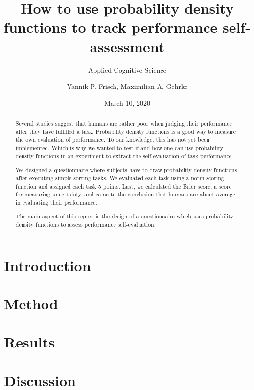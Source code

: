 \documentclass[
pdfa=false,  %
color=9c,
logo=body,
class=article,
marginpar=false,
logofile=../logos/tuda_logo.pdf
]{tudapub}
\author{Yannik P. Frisch, Maximilian A. Gehrke}
\title{How to use probability density functions to track performance self-assessment}
\date{March 10, 2020}
\subtitle{Applied Cognitive Science}
\begin{document}
\maketitle

\begin{abstract}
	Several studies suggest that humans are rather poor when judging their performance after they have fulfilled a task. Probability density functions is a good way to measure the own evaluation of performance. To our knowledge, this has not yet been implemented. Which is why we wanted to test if and how one can use probability density functions in an experiment to extract the self-evaluation of task performance.
	
	We designed a questionnaire where subjects have to draw probability density functions after executing simple sorting tasks. We evaluated each task using a norm scoring function and assigned each task 5 points. Last, we calculated the Brier score, a score for measuring uncertainty, and came to the conclusion that humans are about average in evaluating their performance.
	
	The main aspect of this report is the design of a questionnaire which uses probability density functions to assess performance self-evaluation. 
\end{abstract}

\newpage
\section{Introduction}
	\label{sec:introduction}
	
	
\newpage
\section{Method}
	\label{sec:method}
	
	
\newpage
\section{Results}
	\label{sec:results}
	
	
\newpage
\section{Discussion}
	\label{sec:discussion}
	
\end{document}
